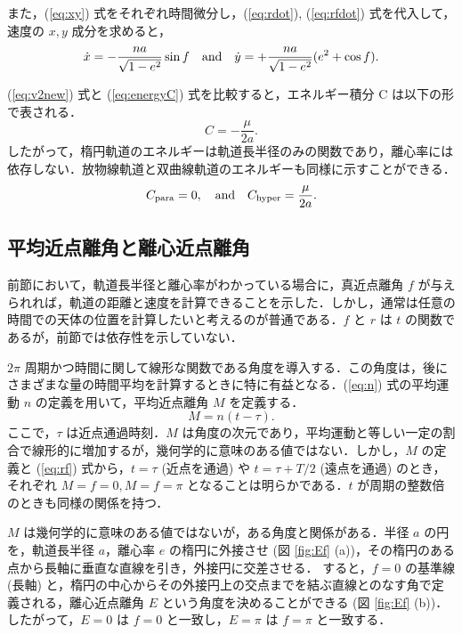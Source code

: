 \documentclass[11pt,a4paper,oneside,onecolumn]{jreport}
\begin{document}
また，(\ref{eq:xy}) 式をそれぞれ時間微分し，(\ref{eq:rdot}),  (\ref{eq:rfdot}) 式を代入して，速度の $x, y$ 成分を求めると，
\begin{equation}
\dot{x} = - \frac{n a}{\sqrt{1 - e^2}} \sin f \quad {\rm and} \quad  \dot{y} = + \frac{n a}{\sqrt{1 - e^2}} (e^2 + \cos f). \label{eq:xdotydot}
\end{equation}

(\ref{eq:v2new}) 式と (\ref{eq:energyC}) 式を比較すると，エネルギー積分 C は以下の形で表される．
\begin{equation}
C = - \frac{\mu}{2 a}. \label{eq:C}
\end{equation}
したがって，楕円軌道のエネルギーは軌道長半径のみの関数であり，離心率には依存しない．放物線軌道と双曲線軌道のエネルギーも同様に示すことができる．
\begin{equation}
C_{{\rm para}} = 0, \quad {\rm and} \quad C_{{\rm hyper}} = \frac{\mu}{2 a}.
\end{equation}

\subsection{平均近点離角と離心近点離角}
前節において，軌道長半径と離心率がわかっている場合に，真近点離角 $f$ が与えられれば，軌道の距離と速度を計算できることを示した．しかし，通常は任意の時間での天体の位置を計算したいと考えるのが普通である．$f$ と $r$ は $t$ の関数であるが，前節では依存性を示していない．

$2 \pi$ 周期かつ時間に関して線形な関数である角度を導入する．この角度は，後にさまざまな量の時間平均を計算するときに特に有益となる．(\ref{eq:n}) 式の平均運動 $n$ の定義を用いて，平均近点離角 $M$ を定義する．
\begin{equation}
M = n (t - \tau). \label{eq:M}
\end{equation}
ここで，$\tau$ は近点通過時刻．$M$ は角度の次元であり，平均運動と等しい一定の割合で線形的に増加するが，幾何学的に意味のある値ではない．しかし，$M$ の定義と (\ref{eq:rf}) 式から，$t = \tau$ (近点を通過) や $t = \tau + T / 2$ (遠点を通過) のとき，それぞれ $M = f =0, M = f = \pi$ となることは明らかである．$t$ が周期の整数倍のときも同様の関係を持つ．

$M$ は幾何学的に意味のある値ではないが，ある角度と関係がある．半径 $a$ の円を，軌道長半径 $a$，離心率 $e$ の楕円に外接させ (図 \ref{fig:Ef} (a))，その楕円のある点から長軸に垂直な直線を引き，外接円に交差させる． すると，$f = 0$ の基準線 (長軸) と，楕円の中心からその外接円上の交点までを結ぶ直線とのなす角で定義される，離心近点離角 $E$ という角度を決めることができる (図 \ref{fig:Ef} (b))．したがって，$E = 0$ は $f = 0$ と一致し，$E = \pi$ は $f = \pi$ と一致する．
\end{document}
